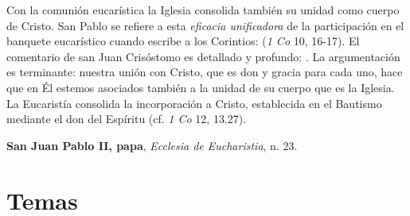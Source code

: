 \begin{patercite}
	Con la comunión eucarística la Iglesia consolida también su unidad como cuerpo de Cristo. San Pablo se refiere a esta \textit{eficacia unificadora} de la participación en el banquete eucarístico cuando escribe a los Corintios:  (\textit{1 Co} 10, 16-17). El comentario de san Juan Crisóstomo es detallado y profundo: . La argumentación es terminante: nuestra unión con Cristo, que es don y gracia para cada uno, hace que en Él estemos asociados también a la unidad de su cuerpo que es la Iglesia. La Eucaristía consolida la incorporación a Cristo, establecida en el Bautismo mediante el don del Espíritu (cf. \textit{1 Co} 12, 13.27).
	
	\textbf{San Juan Pablo II, papa}, \textit{Ecclesia de Eucharistia}, n. 23.
\end{patercite}



\newsection
\section{Temas}


